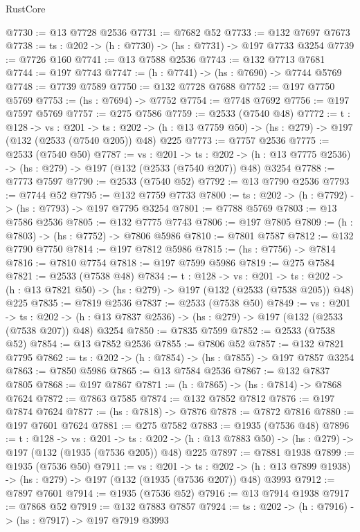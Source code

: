 \begin{lexlean}{RustCore}
\begin{coremodule}
@7730 := @13 @7728 @2536
@7731 := @7682 @52
@7733 := @132 @7697 @7673
@7738 := {ts : @202} -> (h : @7730) -> (hs : @7731) -> @197 @7733 @3254
@7739 := @7726 @160
@7741 := @13 @7588 @2536
@7743 := @132 @7713 @7681
@7744 := @197 @7743
@7747 := (h : @7741) -> (hs : @7690) -> @7744 @5769
@7748 := @7739 @7589
@7750 := @132 @7728 @7688
@7752 := @197 @7750 @5769
@7753 := (hs : @7694) -> @7752
@7754 := @7748 @7692
@7756 := @197 @7597 @5769
@7757 := @275 @7586
@7759 := @2533 (@7540 @48)
@7772 := {t : @128} ->
  {vs : @201} ->
  {ts : @202} -> (h : @13 @7759 @50) -> (hs : @279) -> @197 (@132 (@2533 (@7540 @205)) @48) @225
@7773 := @7757 @2536
@7775 := @2533 (@7540 @50)
@7787 := {vs : @201} ->
  {ts : @202} -> (h : @13 @7775 @2536) -> (hs : @279) -> @197 (@132 (@2533 (@7540 @207)) @48) @3254
@7788 := @7773 @7597
@7790 := @2533 (@7540 @52)
@7792 := @13 @7790 @2536
@7793 := @7744 @52
@7795 := @132 @7759 @7733
@7800 := {ts : @202} -> (h : @7792) -> (hs : @7793) -> @197 @7795 @3254
@7801 := @7788 @5769
@7803 := @13 @7586 @2536
@7805 := @132 @7775 @7743
@7806 := @197 @7805
@7809 := (h : @7803) -> (hs : @7752) -> @7806 @5986
@7810 := @7801 @7587
@7812 := @132 @7790 @7750
@7814 := @197 @7812 @5986
@7815 := (hs : @7756) -> @7814
@7816 := @7810 @7754
@7818 := @197 @7599 @5986
@7819 := @275 @7584
@7821 := @2533 (@7538 @48)
@7834 := {t : @128} ->
  {vs : @201} ->
  {ts : @202} -> (h : @13 @7821 @50) -> (hs : @279) -> @197 (@132 (@2533 (@7538 @205)) @48) @225
@7835 := @7819 @2536
@7837 := @2533 (@7538 @50)
@7849 := {vs : @201} ->
  {ts : @202} -> (h : @13 @7837 @2536) -> (hs : @279) -> @197 (@132 (@2533 (@7538 @207)) @48) @3254
@7850 := @7835 @7599
@7852 := @2533 (@7538 @52)
@7854 := @13 @7852 @2536
@7855 := @7806 @52
@7857 := @132 @7821 @7795
@7862 := {ts : @202} -> (h : @7854) -> (hs : @7855) -> @197 @7857 @3254
@7863 := @7850 @5986
@7865 := @13 @7584 @2536
@7867 := @132 @7837 @7805
@7868 := @197 @7867
@7871 := (h : @7865) -> (hs : @7814) -> @7868 @7624
@7872 := @7863 @7585
@7874 := @132 @7852 @7812
@7876 := @197 @7874 @7624
@7877 := (hs : @7818) -> @7876
@7878 := @7872 @7816
@7880 := @197 @7601 @7624
@7881 := @275 @7582
@7883 := @1935 (@7536 @48)
@7896 := {t : @128} ->
  {vs : @201} ->
  {ts : @202} -> (h : @13 @7883 @50) -> (hs : @279) -> @197 (@132 (@1935 (@7536 @205)) @48) @225
@7897 := @7881 @1938
@7899 := @1935 (@7536 @50)
@7911 := {vs : @201} ->
  {ts : @202} -> (h : @13 @7899 @1938) -> (hs : @279) -> @197 (@132 (@1935 (@7536 @207)) @48) @3993
@7912 := @7897 @7601
@7914 := @1935 (@7536 @52)
@7916 := @13 @7914 @1938
@7917 := @7868 @52
@7919 := @132 @7883 @7857
@7924 := {ts : @202} -> (h : @7916) -> (hs : @7917) -> @197 @7919 @3993

\end{coremodule}
\end{lexlean}
